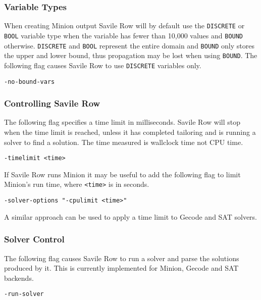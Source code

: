 \documentclass[a4paper]{article}
\newcommand{\savilerow}{{\sc Savile Row}\xspace}
\begin{document}
\subsubsection*{Variable Types}

When creating Minion output \savilerow will by default use the \texttt{DISCRETE} or \texttt{BOOL} variable type
when the variable has fewer than 10,000 values and \texttt{BOUND} otherwise. 
\texttt{DISCRETE} and \texttt{BOOL} represent the entire domain and \texttt{BOUND} only stores the
upper and lower bound, thus propagation may be lost when using \texttt{BOUND}. 
The following flag causes \savilerow to use \texttt{DISCRETE} variables only. 

\begin{verbatim}
-no-bound-vars
\end{verbatim}

\subsubsection{Controlling \savilerow}

The following flag specifies a time limit in milliseconds. \savilerow will stop 
when the time limit is reached, unless it has completed tailoring and is 
running a solver to find a solution. The time measured is wallclock time not 
CPU time. 

\begin{verbatim}
-timelimit <time>
\end{verbatim}

If \savilerow runs Minion it may be useful to add the following flag to limit
Minion's run time, where \texttt{<time>} is in seconds.

\begin{verbatim}
-solver-options "-cpulimit <time>"
\end{verbatim}

A similar approach can be used to apply a time limit to Gecode and SAT solvers. 

\subsubsection{Solver Control}

The following flag causes \savilerow to run a solver and parse the solutions produced by it. 
This is currently implemented for Minion, Gecode and SAT backends. 

\begin{verbatim}
-run-solver
\end{verbatim}
\end{document}
